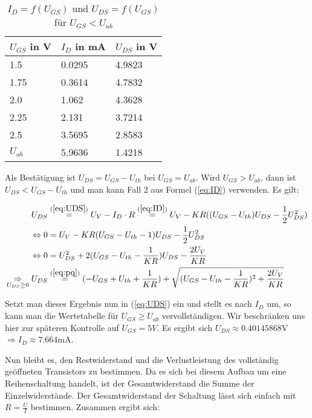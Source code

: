 \documentclass[12pt,a4paper]{scrartcl}
\begin{document}
\begin{table}[h]
    \centering
    \begin{tabular}{l|l|l}
    \hline
    $U_{GS}$ in V     & $I_D$ in mA  & $U_{DS}$ in V \\
    \hline
    1.5               & 0.0295       & 4.9823        \\
    1.75              & 0.3614       & 4.7832        \\
    2.0               & 1.062        & 4.3628        \\
    2.25              & 2.131        & 3.7214        \\
    2.5               & 3.5695       & 2.8583        \\
    $U_{ab}$          & 5.9636       & 1.4218        \\
    \hline
    \end{tabular}
    \caption{$I_D = f(U_{GS})$ und $U_{DS} = f(U_{GS})$ f\"ur $U_{GS} < U_{ab}$}
    \label{tab:wertevorb}
\end{table}

Als Best\"atigung ist $U_{DS} = U_{GS} - U_{th}$ bei $U_{GS} = U_{ab}$.
Wird $U_{GS} > U_{ab}$, dann ist $U_{DS} < U_{GS} - U_{th}$ und man kann Fall 2 aus Formel (\ref{eq:ID}) verwenden.
Es gilt:

\begin{align}
U_{DS} & \overset{(\ref{eq:UDS})}{=} U_V - I_D \cdot R \overset{(\ref{eq:ID})}{=} U_V - KR((U_{GS} - U_{th})U_{DS} - \frac{1}{2}U_{DS}^2) \nonumber \\
\Leftrightarrow 0 & = U_V - KR(U_{GS} - U_{th} - 1)U_{DS} - \frac{1}{2}U_{DS}^2 \nonumber \\
\Leftrightarrow 0 & = U_{DS}^2 + 2(U_{GS} - U_{th} - \frac{1}{KR})U_{DS} - \frac{2U_V}{KR} \nonumber \\
\underset{U_{DS} \geq 0}{\Rightarrow} U_{DS} & \overset{(\ref{eq:pq})}{=} (-U_{GS} + U_{th} + \frac{1}{KR}) + \sqrt{(U_{GS} - U_{th} - \frac{1}{KR})^2 + \frac{2U_V}{KR}}
\end{align}

Setzt man dieses Ergebnis nun in (\ref{eq:UDS}) ein und stellt es nach $I_D$ um, so kann man die Wertetabelle f\"ur $U_{GS} \geq U_{ab}$ vervollst\"andigen.
Wir beschr\"anken uns hier zur sp\"ateren Kontrolle auf $U_{GS} = 5V$.
Es ergibt sich $U_{DS} \approx 0.40145868$V $\Rightarrow I_D \approx 7.664$mA.

Nun bleibt es, den Restwiderstand und die Verlustleistung des vollst\"andig ge\"offneten Transistors zu bestimmen.
Da es sich bei diesem Aufbau um eine Reihenschaltung handelt, ist der Gesamtwiderstand die Summe der Einzelwiderst\"ande.
Der Gesamtwiderstand der Schaltung l\"asst sich einfach mit $R = \frac{U}{I}$ bestimmen.
Zusammen ergibt sich:
\end{document}
